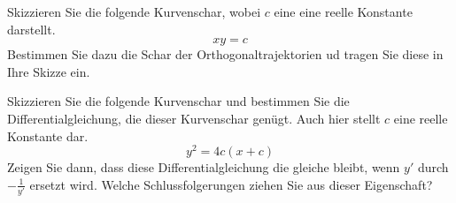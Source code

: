 \begin{atiTask}[
	topic = Gewöhnliche Differentialgleichungen,
	subtopic = Separable Differentialgleichungen,
	title = Orthogonaltrajektorien,
	language = Deutsch
]
	\begin{atiSubtasks}
		\item {
			Skizzieren Sie die folgende Kurvenschar, wobei $c$ eine eine reelle Konstante darstellt.
			\[
				xy = c
			\]
			Bestimmen Sie dazu die Schar der Orthogonaltrajektorien ud tragen Sie diese in Ihre Skizze ein.
		}
		\item{
			Skizzieren Sie die folgende Kurvenschar und bestimmen Sie die Differentialgleichung, die dieser Kurvenschar genügt.
			Auch hier stellt $c$ eine reelle Konstante dar.
			\[
				y^2 = 4c(x+c)
			\]
			Zeigen Sie dann, dass diese Differentialgleichung die gleiche bleibt, wenn $y'$ durch $-\frac{1}{y'}$ ersetzt wird.
			Welche Schlussfolgerungen ziehen Sie aus dieser Eigenschaft?
		}
	\end{atiSubtasks}
\end{atiTask}